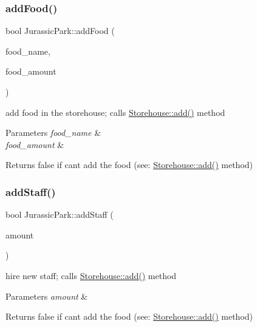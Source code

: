 \subsubsection{\texorpdfstring{add\+Food()}{addFood()}}
{\footnotesize\ttfamily bool Jurassic\+Park\+::add\+Food (\begin{DoxyParamCaption}\item[{\hyperlink{classString}{String} const \&}]{food\+\_\+name,  }\item[{const \hyperlink{StorageUnit_8hpp_a13b2ba6b0400e1aa0b57282bd1228f20}{Unit\+Amount}}]{food\+\_\+amount }\end{DoxyParamCaption})}

add food in the storehouse; calls \hyperlink{classStorehouse_abd7448c73850f9281174e13a918e4c14}{Storehouse\+::add()} method 
\begin{DoxyParams}{Parameters}
{\em food\+\_\+name} & \\
\hline
{\em food\+\_\+amount} & \\
\hline
\end{DoxyParams}
\begin{DoxyReturn}{Returns}
false if can\textquotesingle{}t add the food (see\+: \hyperlink{classStorehouse_abd7448c73850f9281174e13a918e4c14}{Storehouse\+::add()} method) 
\end{DoxyReturn}
\mbox{\label{classJurassicPark_ae8e4c7c8073b6820dcef893b55cccb7e}} 
\subsubsection{\texorpdfstring{add\+Staff()}{addStaff()}}
{\footnotesize\ttfamily bool Jurassic\+Park\+::add\+Staff (\begin{DoxyParamCaption}\item[{const \hyperlink{StorageUnit_8hpp_a13b2ba6b0400e1aa0b57282bd1228f20}{Unit\+Amount}}]{amount }\end{DoxyParamCaption})}

hire new staff; calls \hyperlink{classStorehouse_abd7448c73850f9281174e13a918e4c14}{Storehouse\+::add()} method 
\begin{DoxyParams}{Parameters}
{\em amount} & \\
\hline
\end{DoxyParams}
\begin{DoxyReturn}{Returns}
false if can\textquotesingle{}t add the food (see\+: \hyperlink{classStorehouse_abd7448c73850f9281174e13a918e4c14}{Storehouse\+::add()} method) 
\end{DoxyReturn}
\mbox{\label{classJurassicPark_a99a269ca6c92887ac396c9aad0e971d5}} 
